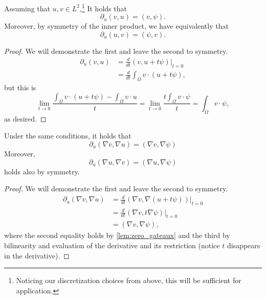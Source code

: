 \begin{lemma}\label{lem:simple_gateaux}
    Assuming that $u, v \in L^2$,\footnote{Noticing our discretization choices from above, this will be sufficient for application.}
    It holds that
    \begin{equation}
        \partial_u (v, u) = (v, \psi).
    \end{equation}
    Moreover, by symmetry of the inner product, we have equivalently that
    \begin{equation}
        \partial_u (u, v) = (\psi, v).
    \end{equation}
\end{lemma}
\begin{proof}
    We will demonstrate the first and leave the second to symmetry.
    \begin{align*}
        \partial_u (v,u) &= \frac{d}{dt} (v, u + t\psi) \bigg|_{t=0} \\
            &= \frac{d}{dt} \int_\Omega v \cdot (u + t \psi),
    \end{align*}
    but this is
    \begin{equation*}
        \lim_{t \to 0} \frac{\int_\Omega v \cdot (u + t \psi) - \int_\Omega v \cdot u}{t} = \lim_{t \to 0}\frac{t \int_\Omega v \cdot \psi }{t} = \int_\Omega v \cdot \psi,
    \end{equation*}
    as desired.
\end{proof}

\begin{lemma}\label{lem:nabla_gateaux}
    Under the same conditions, it holds that
    \begin{equation}
        \partial_u (\nabla v, \nabla u) = (\nabla v, \nabla\psi)
    \end{equation}
    Moreover,
    \begin{equation}
        \partial_u (\nabla u, \nabla v) = (\nabla u, \nabla\psi)
    \end{equation}
    holds also by symmetry.
\end{lemma}
\begin{proof}
    We will demonstrate the first and leave the second to symmetry.
    \begin{align*}
        \partial_u (\nabla v,\nabla u) &= \frac{d}{dt} (\nabla v, \nabla( u + t\psi)) \bigg|_{t=0} \\
            &= \frac{d}{dt} (\nabla v, t \nabla \psi)\bigg|_{t=0} \\
            &= (\nabla v, \nabla \psi),
    \end{align*}
    where the second equality holds by \autoref{lem:zero_gateaux} and the third by bilinearity 
    and evaluation of the derivative and its restriction (notice $t$ disappears in the derivative).
\end{proof}

